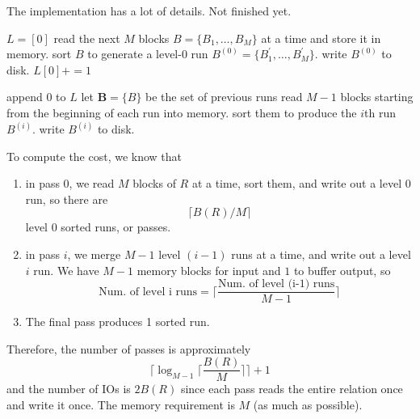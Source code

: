    \begin{algo}
      The implementation has a lot of details. Not finished yet. 
      \begin{algorithm}[H]
        \begin{algorithmic}
            \State $L = [0]$ 
             
              \State read the next $M$ blocks $B = \{B_1, \ldots, B_M \}$ at a time and store it in memory.
              \State sort $B$ to generate a level-0 run $B^{(0)} = \{B_1^\prime, \ldots, B_M^\prime \}$.
              \State write $B^{(0)}$ to disk. 
              \State $L[0] += 1$
            \EndWhile

              \State append $0$ to $L$ 
              \State let $\mathbf{B} = \{B\}$ be the set of previous runs 
                \State read $M-1$ blocks starting from the beginning of each run into memory. 
                \State sort them to produce the $i$th run $B^{(i)}$. 
                \State write $B^{(i)}$ to disk. 
              \EndWhile
            \EndWhile

          \EndFunction
        \end{algorithmic}
      \end{algorithm}
      To compute the cost, we know that 
      \begin{enumerate}
        \item in pass 0, we read $M$ blocks of $R$ at a time, sort them, and write out a level 0 run, so there are 
          \begin{equation}
            \lceil B(R) / M \rceil
          \end{equation}
          level 0 sorted runs, or passes. 

        \item in pass $i$, we merge $M-1$ level $(i-1)$ runs at a time, and write out a level $i$ run. We have $M-1$ memory blocks for input and $1$ to buffer output, so 
          \begin{equation}
            \text{Num. of level i runs} = \bigg\lceil \frac{\text{Num. of level (i-1) runs}}{M-1} \bigg\rceil 
          \end{equation}

        \item The final pass produces 1 sorted run. 
      \end{enumerate}

      Therefore, the number of passes is approximately 
      \begin{equation}
        \bigg\lceil \log_{M-1} \Big\lceil \frac{B(R)}{M} \Big\rceil \bigg\rceil + 1
      \end{equation}
      and the number of IOs is $2 B(R)$ since each pass reads the entire relation once and write it once. The memory requirement is $M$ (as much as possible). 
    \end{algo}

